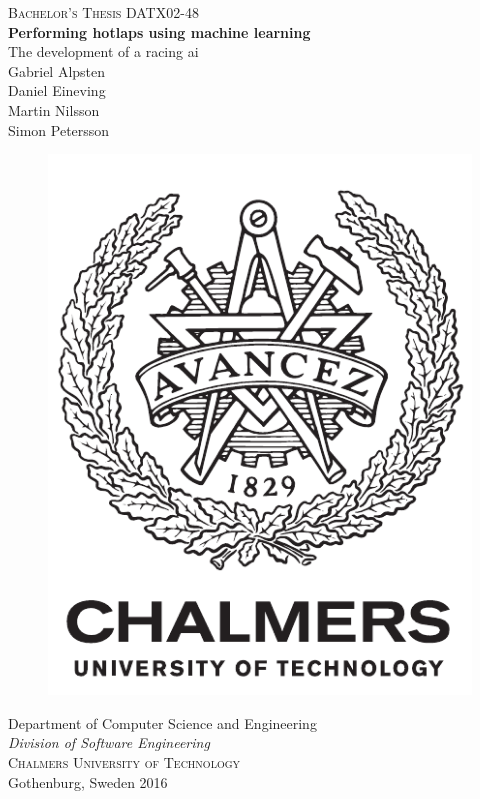 \newpage
\thispagestyle{empty}
\begin{center}
	\textsc{\large Bachelor's Thesis DATX02-48 }\\[4cm]		%
	\textbf{\Large Performing hotlaps using machine learning} \\[1cm]
	{\large The development of a racing ai}\\[1cm]
	{\large Gabriel Alpsten}\\
	{\large Daniel Eineving}\\
	{\large Martin Nilsson}\\
	{\large Simon Petersson}
	
	\vfill	
	\begin{figure}[H]
	\centering
	\includegraphics[width=0.2\pdfpagewidth]{report/images/auxiliary/logo_eng.pdf} \\	
	\end{figure}	\vspace{5mm}	

	Department of Computer Science and Engineering \\
	\emph{Division of Software Engineering}\\
	\textsc{Chalmers University of Technology} \\
	Gothenburg, Sweden 2016 \\
\end{center}


